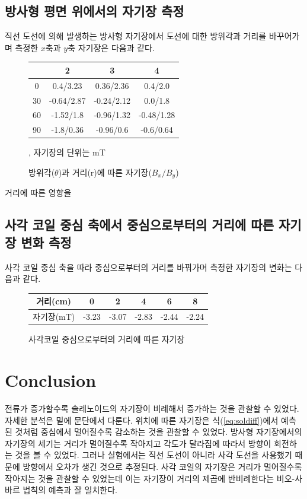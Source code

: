 \documentclass[a4paper]{article}
\begin{document}
{	\subsection{방사형 평면 위에서의 자기장 측정}
	직선 도선에 의해 발생하는 방사형 자기장에서 도선에 대한 방위각과 거리를 바꾸어가며 측정한 $x$축과 $y$축 자기장은 다음과 같다.
	\begin{figure}[h]
		\centering
		\begin{tabular}{|c|c|c|c|}
			\hline 
			\diagbox{$\theta(^{\circ})$}{r(\si{cm})} & 2 & 3 & 4 \\
			\hline
			0 & 0.4/3.23 & 0.36/2.36 & 0.4/2.0 \\
			\hline
			30 & -0.64/2.87 & -0.24/2.12 & 0.0/1.8 \\
			\hline
			60 & -1.52/1.8 & -0.96/1.32 & -0.48/1.28 \\
			\hline
			90 & -1.8/0.36 & -0.96/0.6 & -0.6/0.64 \\
			\hline 
		\end{tabular}
		\caption{방위각($\theta$)과 거리(r)에 따른 자기장($B_{x}/B_{y}$)}, 자기장의 단위는 \si{mT}
		\label{tab:xymag}
	\end{figure}

	거리에 따른 영향을 


	\subsection{사각 코일 중심 축에서 중심으로부터의 거리에 따른 자기장 변화 측정}
	사각 코일 중심 축을 따라 중심으로부터의 거리를 바꿔가며 측정한 자기장의 변화는 다음과 같다.
	\begin{figure}[h]
			\centering
			\begin{tabular}{c|ccccc}
				\hline \hline
				거리(\si{cm}) & 0 & 2 & 4 & 6 & 8 \\
				\hline
				자기장(\si{mT}) & -3.23 & -3.07 & -2.83 & -2.44 & -2.24 \\
				\hline \hline
			\end{tabular}
			\caption{사각코일 중심으로부터의 거리에 따른 자기장}
			\label{tab:sagakre}
	\end{figure}

\section{Conclusion}
	
	전류가 증가할수록 솔레노이드의 자기장이 비례해서 증가하는 것을 관찰할 수 있었다.
	자세한 분석은 밑에 문단에서 다룬다. 
	위치에 따른 자기장은 식(\ref{eq:soldiff})에서 예측된 것처럼 중심에서 멀어질수록 감소하는 것을 관찰할 수 있었다.
	방사형 자기장에서의 자기장의 세기는 거리가 멀어질수록 작아지고 각도가 달라짐에 따라서 방향이 회전하는 것을 볼 수 있었다.
	그러나 실험에서는 직선 도선이 아니라 사각 도선을 사용했기 때문에 방향에서 오차가 생긴 것으로 추정된다.	
	사각 코일의 자기장은 거리가 멀어질수록 작아지는 것을 관찰할 수 있었는데 이는 자기장이 거리의 제곱에 반비례한다는 비오-사바르 법칙의 예측과 잘 일치한다.

}
\end{document}
